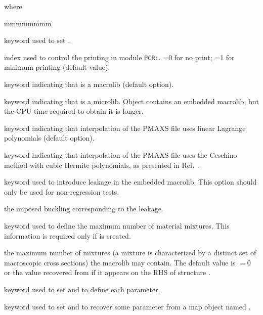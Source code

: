 \noindent where
\begin{ListeDeDescription}{mmmmmmmm}

\item[\moc{EDIT}] keyword used to set .

\item[\dusa{iprint}] index used to control the printing in module {\tt PCR:}. =0 for no print; =1 for minimum printing (default value).

\item[\moc{MACRO}] keyword indicating that  is a {\sc macrolib} (default option).

\item[\moc{MICRO}] keyword indicating that  is a {\sc microlib}. Object  contains an embedded {\sc macrolib}, but the CPU time required to obtain it is longer.

\item[\moc{LINEAR}] keyword indicating that interpolation of the PMAXS file uses linear Lagrange polynomials (default option).

\item[\moc{CUBIC}] keyword indicating that interpolation of the PMAXS file uses the Ceschino method
with cubic Hermite polynomials, as presented in Ref.~\cite{Intech2011}.

\item[\moc{LEAK}] keyword used to introduce leakage in the embedded {\sc macrolib}. This option should only be used for non-regression tests.

\item[\dusa{b2}] the imposed buckling corresponding to the leakage.

\item[\moc{NMIX}] keyword used to define the maximum number of material mixtures. This information is required  only if  is created.

\item[\dusa{nmixt}] the maximum number of mixtures (a mixture is characterized by a distinct set of 
macroscopic cross sections) the {\sc macrolib} may contain. The default value is  $=0$ or the value recovered from  if
it appears on the RHS of structure .

\item[\moc{PMAXS}] keyword used to set  and to define each parameter.

\item[\moc{TABLE}] keyword used to set  and to recover some parameter from a {\sc map} object named .


\end{ListeDeDescription}
